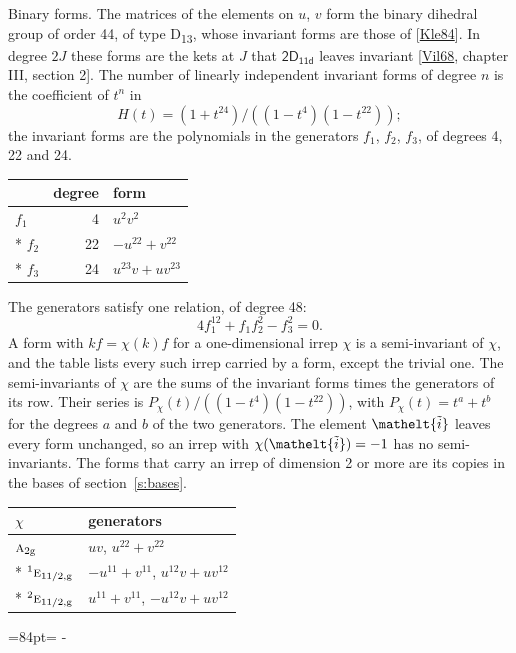 \documentclass[10pt,a4paper]{article}
\makeatletter
\renewcommand\paragraph{\@startsection{paragraph}{4}{\z@}{1.5ex plus .5ex minus .2ex}{-1em}%
  {\normalfont\small\sffamily\bfseries\color{parttitle}}}
\newcommand{\needspace}[1]{\par\penalty-100\begingroup\dimen0=#1\relax\dimen2=\pagegoal
  \advance\dimen2-\pagetotal\ifdim\dimen0>\dimen2\relax\ifdim\dimen2>0pt\vfil\break\fi\fi
  \endgroup}
\numberwithin{equation}{section}
\newcommand{\eltfont}[1]{{\let\sigma\eltsigma\mathelt{#1}}}
\newcommand{\grp}[1]{\mathsf{#1}}
\newcommand{\irr}[1]{\text{\normalfont\scshape #1}}
\newcommand{\conjpair}[1]{{}^{#1}}
\newcommand{\elt}[1]{\eltfont{#1}}
\newcommand{\ptag}[1]{\mathrm{#1}}
\newcommand{\lift}[1]{\tilde{#1}}
\makeatother
\begin{document}
\paragraph{Binary forms.}
The matrices of the elements on $u$, $v$ form the binary dihedral group of order 44, of type D\textsubscript{13}, whose invariant forms are those of [\href{../../../REFERENCES.pdf\#ref.Kle84}{Kle84}]. In degree $2J$ these forms are the kets at $J$ that $\grp{2D_{11d}}$ leaves invariant [\href{../../../REFERENCES.pdf\#ref.Vil68}{Vil68}, chapter III, section 2]. \label{n:head.degree}\label{n:head.form}The number of linearly independent invariant forms of degree $n$ is the coefficient of $t^n$ in
\begin{equation}\label{e:molien}H(t) = (1 + t^{24})/((1-t^{4})(1-t^{22}));\end{equation}
the invariant forms are the polynomials in the generators $f_1$, $f_2$, $f_3$, of degrees 4, 22 and 24.
{\small\begin{longtable}{@{}lrl@{}}\toprule
& degree & form\\\midrule\endhead
\bottomrule\endfoot\endlastfoot
$f_{1}$ & 4 & $u^{2}v^{2}$\\*
$f_{2}$ & 22 & $-u^{22} + v^{22}$\\*
$f_{3}$ & 24 & $u^{23}v + uv^{23}$\\
\bottomrule\end{longtable}}
The generators satisfy one relation, of degree 48:
\begin{equation}\label{e:relation}4f_{1}^{12} + f_{1}f_{2}^{2} - f_{3}^{2} = 0.\end{equation}
A form with $k f = \chi(k) f$ for a one-dimensional irrep $\chi$ is a semi-invariant of $\chi$, and the table lists every such irrep carried by a form, except the trivial one. \label{n:head.generators}The semi-invariants of $\chi$ are the sums of the invariant forms times the generators of its row. Their series is $P_\chi(t)/((1-t^{4})(1-t^{22}))$, with $P_\chi(t) = t^{a} + t^{b}$ for the degrees $a$ and $b$ of the two generators. The element $\elt{\lift{i}}$ leaves every form unchanged, so an irrep with $\chi(\elt{\lift{i}}) = -1$ has no semi-invariants. The forms that carry an irrep of dimension 2 or more are its copies in the bases of section~\ref{s:bases}.
{\small\begin{longtable}{@{}ll@{}}\toprule
$\chi$ & generators\\\midrule\endhead
\bottomrule\endfoot\endlastfoot
$\irr{a}_{2\ptag{g}}$ & $uv$, $u^{22} + v^{22}$\\*
$\conjpair{1}\irr{e}_{11/2,\ptag{g}}$ & $-u^{11} + v^{11}$, $u^{12}v + uv^{12}$\\*
$\conjpair{2}\irr{e}_{11/2,\ptag{g}}$ & $u^{11} + v^{11}$, $-u^{12}v + uv^{12}$\\
\bottomrule\end{longtable}}
\needspace{84pt}
\end{document}
